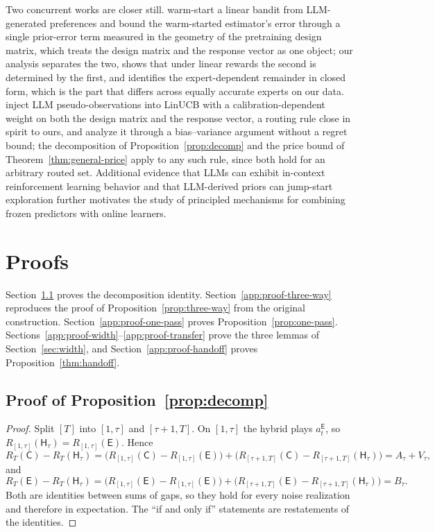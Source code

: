 \documentclass{article}
\theoremstyle{definition}
\theoremstyle{remark}
\theoremstyle{remark}
\newcommand{\Cold}{\mathsf{C}}
\newcommand{\Exp}{\mathsf{E}}
\newcommand{\Hyb}{\mathsf{H}}
\begin{document}
Two concurrent works are closer still. \cite{jumpstart2026} warm-start a linear
bandit from LLM-generated preferences and bound the warm-started estimator's
error through a single prior-error term measured in the geometry of the
pretraining design matrix, which treats the design matrix and the response
vector as one object; our analysis separates the two, shows that under linear
rewards the second is determined by the first, and identifies the
expert-dependent remainder in closed form, which is the part that differs
across equally accurate experts on our data. \cite{calibgated2026} inject LLM
pseudo-observations into LinUCB with a calibration-dependent weight on both the
design matrix and the response vector, a routing rule close in spirit to ours,
and analyze it through a bias--variance argument without a regret bound; the
decomposition of Proposition~\ref{prop:decomp} and the price bound of
Theorem~\ref{thm:general-price} apply to any such rule, since both hold for an
arbitrary routed set. Additional evidence that LLMs can
exhibit in-context reinforcement learning behavior
\cite{monea2024llms,krishnamurthy2024can} and that LLM-derived priors can
jump-start exploration \cite{alamdari2024jumpstarting,abbasiyadkori2024believe}
further motivates the study of principled mechanisms for combining frozen
predictors with online learners.


\section{Proofs}
\label{app:proofs}

Section~\ref{app:proof-decomp} proves the decomposition identity.
Section~\ref{app:proof-three-way} reproduces the proof of
Proposition~\ref{prop:three-way} from the original construction.
Section~\ref{app:proof-one-pass} proves Proposition~\ref{prop:one-pass}.
Sections~\ref{app:proof-width}--\ref{app:proof-transfer} prove the three
lemmas of Section~\ref{sec:width}, and Section~\ref{app:proof-handoff}
proves Proposition~\ref{thm:handoff}.

\subsection{Proof of Proposition~\ref{prop:decomp}}
\label{app:proof-decomp}

\begin{proof}
Split $[T]$ into $[1,\tau]$ and $[\tau+1,T]$. On $[1,\tau]$ the hybrid plays
$a_t^{\Exp}$, so $R_{[1,\tau]}(\Hyb_\tau)=R_{[1,\tau]}(\Exp)$. Hence
\[
R_T(\Cold)-R_T(\Hyb_\tau)
=\bigl(R_{[1,\tau]}(\Cold)-R_{[1,\tau]}(\Exp)\bigr)
+\bigl(R_{[\tau+1,T]}(\Cold)-R_{[\tau+1,T]}(\Hyb_\tau)\bigr)
=A_\tau+V_\tau ,
\]
and
\[
R_T(\Exp)-R_T(\Hyb_\tau)
=\bigl(R_{[1,\tau]}(\Exp)-R_{[1,\tau]}(\Exp)\bigr)
+\bigl(R_{[\tau+1,T]}(\Exp)-R_{[\tau+1,T]}(\Hyb_\tau)\bigr)
=B_\tau .
\]
Both are identities between sums of gaps, so they hold for every noise
realization and therefore in expectation. The ``if and only if'' statements
are restatements of the identities.
\end{proof}
\end{document}
